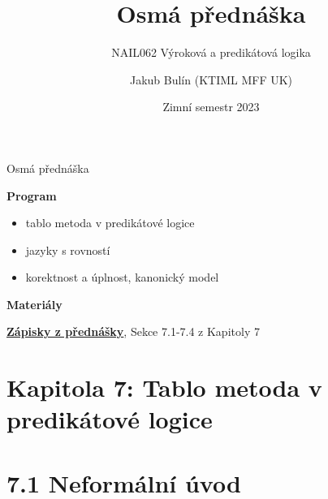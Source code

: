 \documentclass{beamer}
\title{Osmá přednáška}
\subtitle{NAIL062 Výroková a predikátová logika}
\author{Jakub Bulín (KTIML MFF UK)}
\date{Zimní semestr 2023}
\begin{document}
\maketitle


\begin{frame}{Osmá přednáška}

    \textbf{Program}
        \begin{itemize}
            \item tablo metoda v predikátové logice
            \item jazyky s rovností
            \item korektnost a úplnost, kanonický model
        \end{itemize}

    \textbf{Materiály}

        \href{https://github.com/jbulin-mff-uk/nail062/raw/main/lecture/lecture-notes/lecture-notes.pdf}{\alert{\textbf{Zápisky z přednášky}}}, Sekce 7.1-7.4 z Kapitoly 7

\end{frame}


\section{\sc Kapitola 7: Tablo metoda v predikátové logice}


\section{7.1 Neformální úvod}
\end{document}

